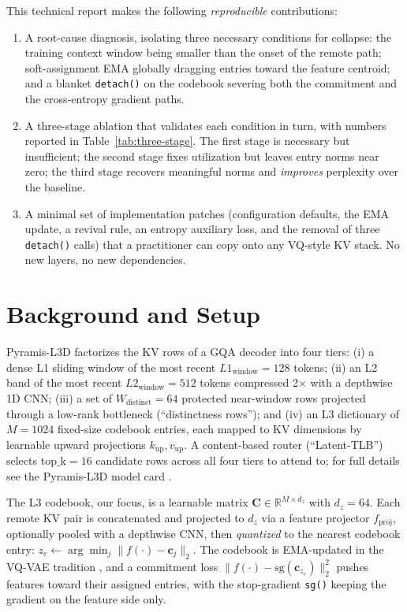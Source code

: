 \documentclass[11pt,a4paper]{article}
\begin{document}
This technical report makes the following \textit{reproducible} contributions:

\begin{enumerate}
  \item A root-cause diagnosis, isolating three necessary conditions for collapse: the
    training context window being smaller than the onset of the remote path; soft-assignment
    EMA globally dragging entries toward the feature centroid; and a blanket
    \texttt{detach()} on the codebook severing both the commitment and the cross-entropy
    gradient paths.
  \item A three-stage ablation that validates each condition in turn, with numbers reported
    in Table~\ref{tab:three-stage}. The first stage is necessary but insufficient; the
    second stage fixes utilization but leaves entry norms near zero; the third stage
    recovers meaningful norms and \textit{improves} perplexity over the baseline.
  \item A minimal set of implementation patches (configuration defaults, the EMA update, a
    revival rule, an entropy auxiliary loss, and the removal of three \texttt{detach()}
    calls) that a practitioner can copy onto any VQ-style KV stack. No new layers, no new
    dependencies.
\end{enumerate}

\section{Background and Setup}

Pyramis-L3D factorizes the KV rows of a GQA \citep{ainslie2023gqa} decoder into four tiers:
(i) a dense L1 sliding window of the most recent $L1_{\text{window}}=128$ tokens; (ii) an L2
band of the most recent $L2_{\text{window}}=512$ tokens compressed 2$\times$ with a
depthwise 1D CNN; (iii) a set of $W_{\text{distinct}}=64$ protected near-window rows
projected through a low-rank bottleneck (``distinctness rows''); and (iv) an L3 dictionary
of $M=1024$ fixed-size codebook entries, each mapped to KV dimensions by learnable upward
projections $k_{\text{up}}, v_{\text{up}}$.  A content-based router (``Latent-TLB'') selects
$\text{top\_k}=16$ candidate rows across all four tiers to attend to; for full details see
the Pyramis-L3D model card \citep{pyramisl3d2026}.

The L3 codebook, our focus, is a learnable matrix $\bm{C}\in\mathbb{R}^{M\times d_z}$ with
$d_z=64$. Each remote KV pair is concatenated and projected to $d_z$ via a feature projector
$f_{\text{proj}}$, optionally pooled with a depthwise CNN, then \textit{quantized} to the
nearest codebook entry: $z_e \leftarrow \arg\min_{j}\|f(\cdot)-\bm{c}_j\|_2$. The codebook
is EMA-updated in the VQ-VAE tradition \citep{van2017neural, razavi2019generating}, and a
commitment loss $\|f(\cdot)-\text{sg}(\bm{c}_{z_e})\|_2^2$ pushes features toward their
assigned entries, with the stop-gradient \texttt{sg()} keeping the gradient on the feature
side only.
\end{document}
